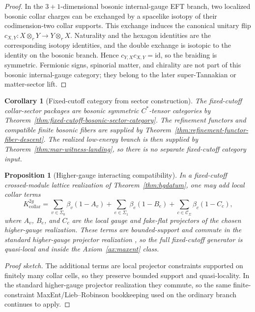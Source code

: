 \documentclass[11pt]{article}
\newtheorem{corollary}[theorem]{Corollary}
\newtheorem{proposition}[theorem]{Proposition}
\begin{document}
\begin{proof}
In the \(3+1\)-dimensional bosonic internal-gauge EFT branch, two localized bosonic collar
charges can be exchanged by a spacelike isotopy of their codimension-two collar supports. This
exchange induces the canonical unitary flip \(c_{X,Y}:X\otimes_r Y\to Y\otimes_r X\). Naturality
and the hexagon identities are the corresponding isotopy identities, and the double exchange is
isotopic to the identity on the bosonic branch. Hence \(c_{Y,X}c_{X,Y}=\mathrm{id}\), so the
braiding is symmetric. Fermionic signs, spinorial matter, and chirality are not part of this
bosonic internal-gauge category; they belong to the later super-Tannakian or matter-sector lift.
\end{proof}

\begin{corollary}[Fixed-cutoff category from sector construction]\label{cor:fixed-cutoff-category-sector-construction}
The fixed-cutoff collar-sector packages are bosonic symmetric \(C^*\)-tensor categories by
Theorem~\ref{thm:fixed-cutoff-bosonic-sector-category}. The refinement functors and compatible
finite bosonic fibers are supplied by Theorem~\ref{thm:refinement-functor-fiber-descent}. The
realized low-energy branch is then supplied by Theorem~\ref{thm:mar-witness-landing}, so there is no
separate fixed-cutoff category input.
\end{corollary}

\begin{proposition}[Higher-gauge interacting compatibility]\label{prop:hginteracting}
In a fixed-cutoff crossed-module lattice realization of Theorem~\ref{thm:hgdatum}, one may add local collar terms
\[
K_{\mathrm{collar}}^{2g}
=
\sum_{v\in\Sigma_0}\beta_v(1-A_v)
+
\sum_{e\in\Sigma_1}\beta_e(1-B_e)
+
\sum_{c\in\mathcal C_\Sigma}\beta_c(1-C_c),
\]
where \(A_v\), \(B_e\), and \(C_c\) are the local gauge and fake-flat projectors of the chosen higher-gauge realization. These terms are bounded-support and commute in the standard higher-gauge projector realization \cite{bullivant17}, so the full fixed-cutoff generator is quasi-local and inside the Axiom~\ref{ax:maxent} class.
\end{proposition}

\begin{proof}[Proof sketch]
The additional terms are local projector constraints supported on finitely many collar cells, so they preserve bounded support and quasi-locality. In the standard higher-gauge projector realization they commute, so the same finite-constraint MaxEnt/Lieb--Robinson bookkeeping used on the ordinary branch continues to apply.
\end{proof}
\end{document}
